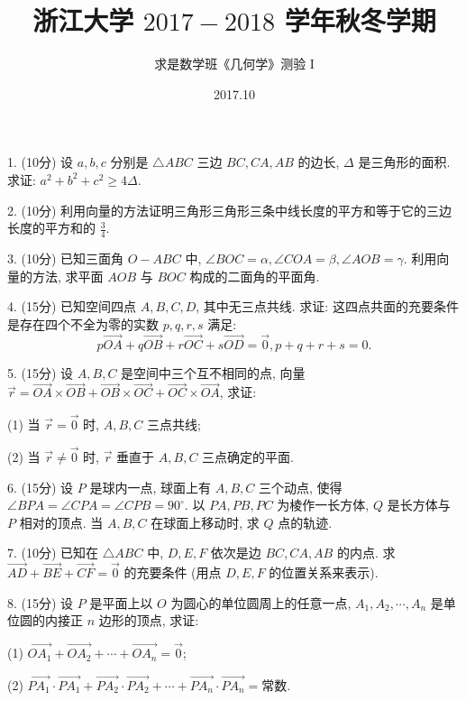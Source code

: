 \documentclass[UTF8]{ctexart}
\title{\textbf{浙江大学 $2017-2018$ 学年秋冬学期}}
\author{求是数学班《几何学》测验 I}
\date{2017.10}
\begin{document}
\maketitle

1. (10分) 设 $a,b,c$ 分别是 $\triangle ABC$ 三边 $BC,CA,AB$ 的边长, $\Delta$ 是三角形的面积. 求证: $a^2+b^2+c^2\geq4\Delta$.

2. (10分) 利用向量的方法证明三角形三角形三条中线长度的平方和等于它的三边长度的平方和的 $\displaystyle\frac{3}{4}$.

3. (10分) 已知三面角 $O-ABC$ 中, $\angle BOC=\alpha,\angle COA=\beta,\angle AOB=\gamma$. 利用向量的方法, 求平面 $AOB$ 与 $BOC$ 构成的二面角的平面角.

4. (15分) 已知空间四点 $A,B,C,D$, 其中无三点共线. 求证: 这四点共面的充要条件是存在四个不全为零的实数 $p,q,r,s$ 满足:
\[
p\overrightarrow{OA}+q\overrightarrow{OB}+r\overrightarrow{OC}+s\overrightarrow{OD}=\overrightarrow{0}, p+q+r+s=0.
\]

5. (15分) 设 $A,B,C$ 是空间中三个互不相同的点, 向量 $\overrightarrow{r}=\overrightarrow{OA}\times\overrightarrow{OB}+\overrightarrow{OB}\times\overrightarrow{OC}+\overrightarrow{OC}\times\overrightarrow{OA}$, 求证:

(1) 当 $\overrightarrow{r}=\overrightarrow{0}$ 时, $A,B,C$ 三点共线;

(2) 当 $\overrightarrow{r}\neq\overrightarrow{0}$ 时, $\overrightarrow{r}$ 垂直于 $A,B,C$ 三点确定的平面.

6. (15分) 设 $P$ 是球内一点, 球面上有 $A,B,C$ 三个动点, 使得 $\angle BPA=\angle CPA=\angle CPB=90^{\circ}$. 以 $PA,PB,PC$ 为棱作一长方体, $Q$ 是长方体与 $P$ 相对的顶点. 当 $A,B,C$ 在球面上移动时, 求 $Q$ 点的轨迹.

7. (10分) 已知在 $\triangle ABC$ 中, $D,E,F$ 依次是边 $BC,CA,AB$ 的内点. 求 $\overrightarrow{AD}+\overrightarrow{BE}+\overrightarrow{CF}=\overrightarrow{0}$ 的充要条件 (用点 $D,E,F$ 的位置关系来表示).

8. (15分) 设 $P$ 是平面上以 $O$ 为圆心的单位圆周上的任意一点, $A_1,A_2,\cdots,A_n$ 是单位圆的内接正 $n$ 边形的顶点, 求证:

(1) $\overrightarrow{OA_1}+\overrightarrow{OA_2}+\cdots+\overrightarrow{OA_n}=\overrightarrow{0}$;

(2) $\overrightarrow{PA_1}\cdot\overrightarrow{PA_1}+\overrightarrow{PA_2}\cdot\overrightarrow{PA_2}+\cdots+\overrightarrow{PA_n}\cdot\overrightarrow{PA_n}=\text{常数}$.
\end{document}
